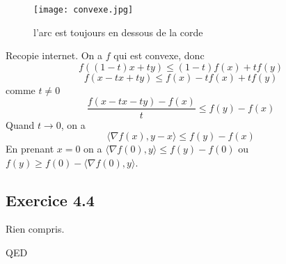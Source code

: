 \documentclass[]{book}
\theoremstyle{definition}
\begin{document}
\begin{figure}[htbp]
    \centerline{\texttt{[image: convexe.jpg]}}
    \caption{l'arc est toujours en dessous de la corde}
    \label{fig}
\end{figure}

Recopie internet.
On a $f$ qui est convexe, donc
$$
f((1-t)x+ty) \leq (1-t)f(x)+tf(y)
$$
$$
f(x-tx+ty) \leq f(x)-tf(x)+tf(y)
$$
comme $t \neq 0$
$$
\frac{f(x-tx-ty)-f(x)}{t} \leq f(y) - f(x)
$$
Quand $t \to 0$, on a 
$$
\langle \nabla f(x),y-x\rangle \leq f(y) - f(x)
$$
En prenant $x=0$ on a $\langle \nabla f(0),y\rangle \leq f(y) - f(0)$ ou $f(y) \geq f(0) - \langle \nabla f(0),y\rangle$.

\subsection*{Exercice 4.4}
Rien compris.


QED
\end{document}
